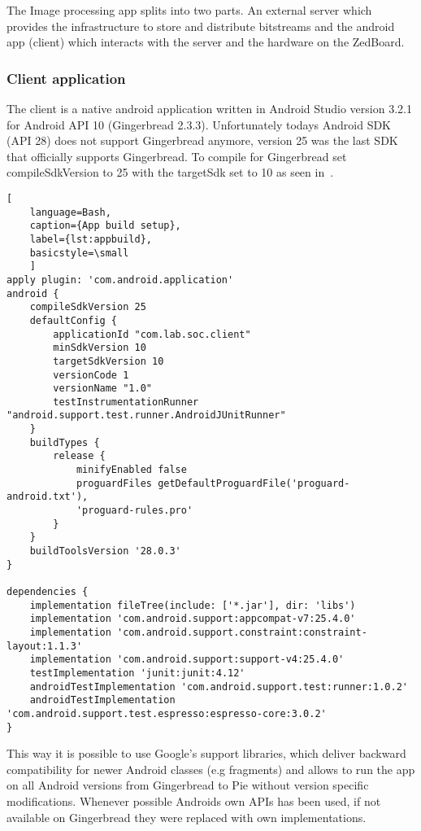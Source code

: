 The Image processing app splits into two parts. An external server which provides the infrastructure to store and distribute bitstreams and 
the android app (client) which interacts with the server and the hardware on the ZedBoard. 

\subsubsection{Client application}

The client is a native android application written in Android Studio version 3.2.1 for Android API 10 (Gingerbread 2.3.3).
Unfortunately todays Android SDK (API 28) does not support Gingerbread anymore, version 25 was the last SDK that officially supports Gingerbread. To compile for Gingerbread set compileSdkVersion to 25 with the targetSdk set to 10 as seen in~.
\begin{lstlisting}[
	language=Bash,
	caption={App build setup},
	label={lst:appbuild},
	basicstyle=\small
	]
apply plugin: 'com.android.application'
android {
    compileSdkVersion 25
    defaultConfig {
        applicationId "com.lab.soc.client"
        minSdkVersion 10
        targetSdkVersion 10
        versionCode 1
        versionName "1.0"
        testInstrumentationRunner "android.support.test.runner.AndroidJUnitRunner"
    }
    buildTypes {
        release {
            minifyEnabled false
            proguardFiles getDefaultProguardFile('proguard-android.txt'), 
            'proguard-rules.pro'
        }
    }
    buildToolsVersion '28.0.3'
}

dependencies {
    implementation fileTree(include: ['*.jar'], dir: 'libs')
    implementation 'com.android.support:appcompat-v7:25.4.0'
    implementation 'com.android.support.constraint:constraint-layout:1.1.3'
    implementation 'com.android.support:support-v4:25.4.0'
    testImplementation 'junit:junit:4.12'
    androidTestImplementation 'com.android.support.test:runner:1.0.2'
    androidTestImplementation 'com.android.support.test.espresso:espresso-core:3.0.2'
}    
\end{lstlisting}
This way it is possible to use Google's support libraries, which deliver
backward compatibility for newer Android classes (e.g fragments) and allows to run the app on all Android versions from Gingerbread to Pie without version specific modifications. Whenever possible Androids own APIs has been used, if not available on Gingerbread they were replaced with own implementations.\newline

